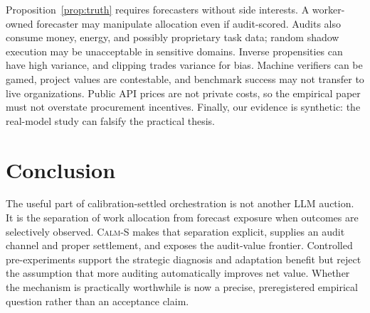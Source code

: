 \documentclass[sigconf,anonymous,review]{acmart}
\newcommand{\calms}{\textsc{Calm-S}}
\begin{document}
Proposition~\ref{prop:truth} requires forecasters without side interests. A
worker-owned forecaster may manipulate allocation even if audit-scored. Audits
also consume money, energy, and possibly proprietary task data; random shadow
execution may be unacceptable in sensitive domains. Inverse propensities can
have high variance, and clipping trades variance for bias. Machine verifiers can
be gamed, project values are contestable, and benchmark success may not transfer
to live organizations. Public API prices are not private costs, so the empirical
paper must not overstate procurement incentives. Finally, our evidence is
synthetic: the real-model study can falsify the practical thesis.


\section{Conclusion}

The useful part of calibration-settled orchestration is not another LLM auction.
It is the separation of work allocation from forecast exposure when outcomes are
selectively observed. \calms{} makes that separation explicit, supplies an audit
channel and proper settlement, and exposes the audit-value frontier. Controlled
pre-experiments support the strategic diagnosis and adaptation benefit but reject
the assumption that more auditing automatically improves net value. Whether the
mechanism is practically worthwhile is now a precise, preregistered empirical
question rather than an acceptance claim.



\end{document}
